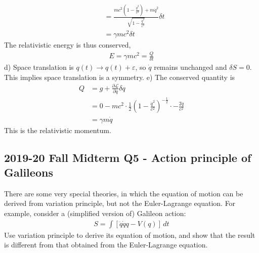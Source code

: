 \documentclass[12pt]{book} %
\numberwithin{equation}{chapter}
\def\c{\gamma}
\def\d{\delta}
\def\e{\varepsilon}
\def\La{\mathcal{L}}
\def\p{\partial}
\begin{document}
\begin{solbox}
\begin{align*}
&=\frac{mc^{2}\left(1-\frac{\dot{q}^{2}}{c^{2}}\right)+m\dot{q}^{2}}{\sqrt{1-\frac{\dot{q}^{2}}{c^{2}}}}\d t\\
&=\c mc^{2}\d t
\end{align*}
The relativistic energy is thus conserved,
\begin{align*}
E=\c mc^{2}=\frac{Q}{\d t}
\end{align*}
d) Space translation is $q(t)\to q(t)+\e$, so $\dot{q}$ remains unchanged and $\d S=0$. This implies space translation is a symmetry.\bigskip\newline
e) The conserved quantity is
\begin{align*}
Q&=g+\frac{\p \La}{\p \dot{q}}\d q\\
&=0-mc^{2}\cdot\frac{1}{2}{\left(1-\frac{\dot{q}^{2}}{c^{2}}\right)}^{-\frac{1}{2}}\cdot-\frac{2\dot{q}}{c^{2}}\\
&=\c m\dot{q}
\end{align*}
This is the relativistic momentum.
\end{solbox}

\subsection*{2019-20 Fall Midterm Q5 - Action principle of Galileons}
\label{Action principle of Galileons}
There are some very special theories, in which the equation of motion can be derived from variation principle, but not the Euler-Lagrange equation. For example, consider a (simplified version of) Galileon action:
\begin{align*}
S=\int \left[\ddot{q}\dot{q}q-V(q)\right]\,dt
\end{align*}
Use variation principle to derive its equation of motion, and show that the result is different from that obtained from the Euler-Lagrange equation.
\end{document}
